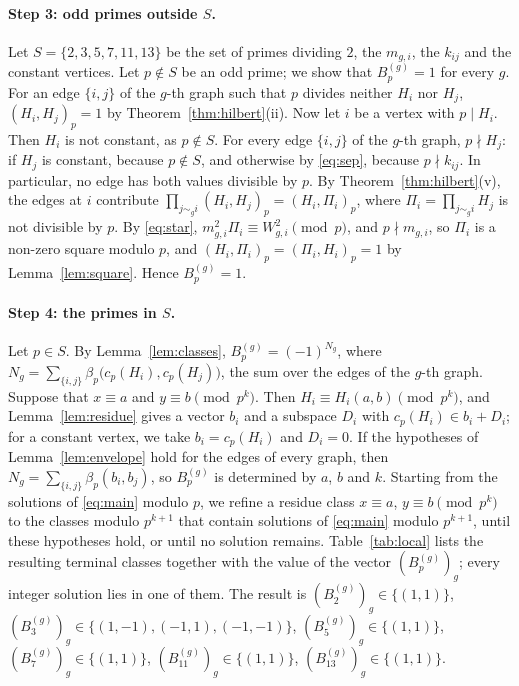 \documentclass[11pt]{article}
\begin{document}
\paragraph{Step 3: odd primes outside $S$.} Let $S=\{2,3,5,7,11,13\}$ be the set of primes dividing $2$, the $m_{g,i}$, the $k_{ij}$ and the constant vertices. Let $p\notin S$ be an odd prime; we show that $B^{(g)}_p=1$ for every $g$. For an edge $\{i,j\}$ of the $g$-th graph such that $p$ divides neither $H_i$ nor $H_j$, $(H_i,H_j)_p=1$ by Theorem~\ref{thm:hilbert}(ii). Now let $i$ be a vertex with $p\mid H_i$. Then $H_i$ is not constant, as $p\notin S$. For every edge $\{i,j\}$ of the $g$-th graph, $p\nmid H_j$: if $H_j$ is constant, because $p\notin S$, and otherwise by \eqref{eq:sep}, because $p\nmid k_{ij}$. In particular, no edge has both values divisible by $p$. By Theorem~\ref{thm:hilbert}(v), the edges at $i$ contribute $\prod_{j\sim_g i}(H_i,H_j)_p=(H_i,\Pi_i)_p$, where $\Pi_i=\prod_{j\sim_g i}H_j$ is not divisible by $p$. By \eqref{eq:star}, $m_{g,i}^2\Pi_i\equiv W_{g,i}^2\pmod p$, and $p\nmid m_{g,i}$, so $\Pi_i$ is a non-zero square modulo $p$, and $(H_i,\Pi_i)_p=(\Pi_i,H_i)_p=1$ by Lemma~\ref{lem:square}. Hence $B^{(g)}_p=1$.

\paragraph{Step 4: the primes in $S$.} Let $p\in S$. By Lemma~\ref{lem:classes}, $B^{(g)}_p=(-1)^{N_g}$, where $N_g=\sum_{\{i,j\}}\beta_p\bigl(c_p(H_i),c_p(H_j)\bigr)$, the sum over the edges of the $g$-th graph. Suppose that $x\equiv a$ and $y\equiv b\pmod{p^k}$. Then $H_i\equiv H_i(a,b)\pmod{p^k}$, and Lemma~\ref{lem:residue} gives a vector $b_i$ and a subspace $D_i$ with $c_p(H_i)\in b_i+D_i$; for a constant vertex, we take $b_i=c_p(H_i)$ and $D_i=0$. If the hypotheses of Lemma~\ref{lem:envelope} hold for the edges of every graph, then $N_g=\sum_{\{i,j\}}\beta_p(b_i,b_j)$, so $B^{(g)}_p$ is determined by $a$, $b$ and $k$. Starting from the solutions of \eqref{eq:main} modulo $p$, we refine a residue class $x\equiv a$, $y\equiv b\pmod{p^k}$ to the classes modulo $p^{k+1}$ that contain solutions of \eqref{eq:main} modulo $p^{k+1}$, until these hypotheses hold, or until no solution remains. Table~\ref{tab:local} lists the resulting terminal classes together with the value of the vector $(B^{(g)}_p)_g$; every integer solution lies in one of them. The result is $(B^{(g)}_{2})_g\in\{(1,1)\}$, $(B^{(g)}_{3})_g\in\{(1,-1),\allowbreak (-1,1),\allowbreak (-1,-1)\}$, $(B^{(g)}_{5})_g\in\{(1,1)\}$, $(B^{(g)}_{7})_g\in\{(1,1)\}$, $(B^{(g)}_{11})_g\in\{(1,1)\}$, $(B^{(g)}_{13})_g\in\{(1,1)\}$.
\end{document}
